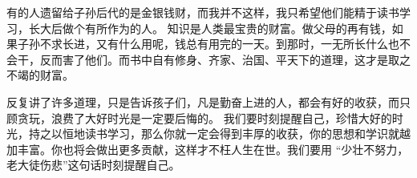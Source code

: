 \documentclass[avery5371,grid]{flashcards}
\begin{document}
{有的人遗留给子孙后代的是金银钱财，而我并不这样，我只希望他们能精于读书学习，长大后做个有所作为的人。} %
{知识是人类最宝贵的财富。做父母的再有钱，如果子孙不求长进，又有什么用呢，钱总有用完的一天。到那时，一无所长什么也不会干，反而害了他们。而书中自有修身、齐家、治国、平天下的道理，这才是取之不竭的财富。} %

{反复讲了许多道理，只是告诉孩子们，凡是勤奋上进的人，都会有好的收获，而只顾贪玩，浪费了大好时光是一定要后悔的。} %
{我们要时刻提醒自己，珍惜大好的时光，持之以恒地读书学习，那么你就一定会得到丰厚的收获，你的思想和学识就越加丰富。你也将会做出更多贡献，这样才不枉人生在世。我们要用 “少壮不努力，老大徒伤悲”这句话时刻提醒自己。} %



\end{document}

